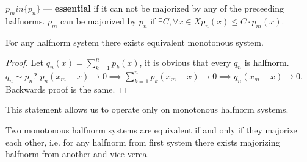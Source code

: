 \begin{defn}
  $p_m in \{p_n\}$ --- \textbf{essential} if it can not be majorized by any of
  the preceeding halfnorms. $p_m$ can be majorized by $p_n$ if $\exists C, \forall x \in X
  p_n(x) \leq C \cdot p_m(x)$.
\end{defn}

\begin{stm}
  For any halfnorm system there exists equivalent monotonous system.
\end{stm}

\begin{proof}
  Let $q_n(x) = \sum\limits_{k = 1}^n p_k(x)$, it is obvious that every $q_n$ is
  halfnorm. ${q_n} \sim {p_n}?$
  $p_n(x_m - x) \to 0 \implies \sum\limits_{k = 1}^n p_k(x_m - x) \to 0 \implies
  q_n(x_m - x) \to 0$. Backwards proof is the same.
\end{proof}

This statement allows us to operate only on monotonous halfnorm systems.
\begin{stm}
  Two monotonous halfnorm systems are equivalent if and only if they majorize
  each other, i.e. for any halfnorm from first system there exists majorizing
  halfnorm from another and vice verca.
\end{stm}



